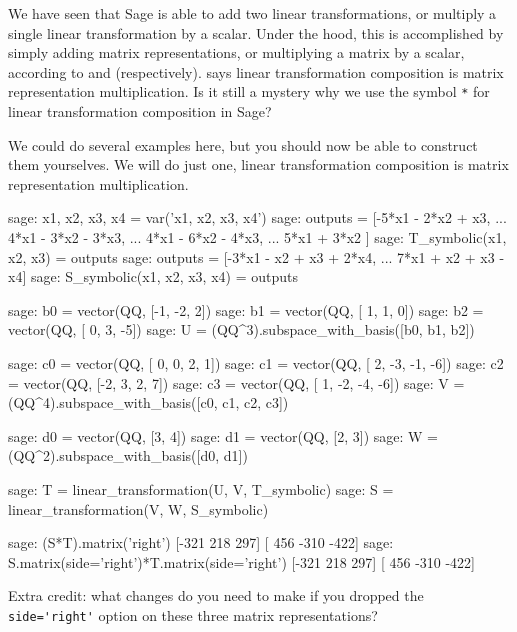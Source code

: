 We have seen that Sage is able to add two linear transformations, or multiply a single linear transformation by a scalar.  Under the hood, this is accomplished by simply adding matrix representations, or multiplying a matrix by a scalar, according to  and  (respectively).   says linear transformation composition is matrix representation multiplication.  Is it still a mystery why we use the symbol \verb?*? for linear transformation composition in Sage?\par
%
We could do several examples here, but you should now be able to construct them yourselves.  We will do just one, linear transformation composition is matrix representation multiplication.
%
\begin{sageexample}
sage: x1, x2, x3, x4 = var('x1, x2, x3, x4')
sage: outputs = [-5*x1 - 2*x2 +   x3,
...               4*x1 - 3*x2 - 3*x3,
...               4*x1 - 6*x2 - 4*x3,
...               5*x1 + 3*x2       ]
sage: T_symbolic(x1, x2, x3) = outputs
sage: outputs = [-3*x1 - x2 + x3 + 2*x4,
...               7*x1 + x2 + x3 -   x4]
sage: S_symbolic(x1, x2, x3, x4) = outputs

sage: b0 = vector(QQ, [-1, -2,  2])
sage: b1 = vector(QQ, [ 1,  1,  0])
sage: b2 = vector(QQ, [ 0,  3, -5])
sage: U = (QQ^3).subspace_with_basis([b0, b1, b2])

sage: c0 = vector(QQ, [ 0,  0,  2,  1])
sage: c1 = vector(QQ, [ 2, -3, -1, -6])
sage: c2 = vector(QQ, [-2,  3,  2,  7])
sage: c3 = vector(QQ, [ 1, -2, -4, -6])
sage: V = (QQ^4).subspace_with_basis([c0, c1, c2, c3])

sage: d0 = vector(QQ, [3, 4])
sage: d1 = vector(QQ, [2, 3])
sage: W = (QQ^2).subspace_with_basis([d0, d1])

sage: T = linear_transformation(U, V, T_symbolic)
sage: S = linear_transformation(V, W, S_symbolic)

sage: (S*T).matrix('right')
[-321  218  297]
[ 456 -310 -422]
sage: S.matrix(side='right')*T.matrix(side='right')
[-321  218  297]
[ 456 -310 -422]
\end{sageexample}
%
Extra credit: what changes do you need to make if you dropped the \verb?side='right'? option on these three matrix representations?
%
\begin{sageverbatim}
\end{sageverbatim}
%

